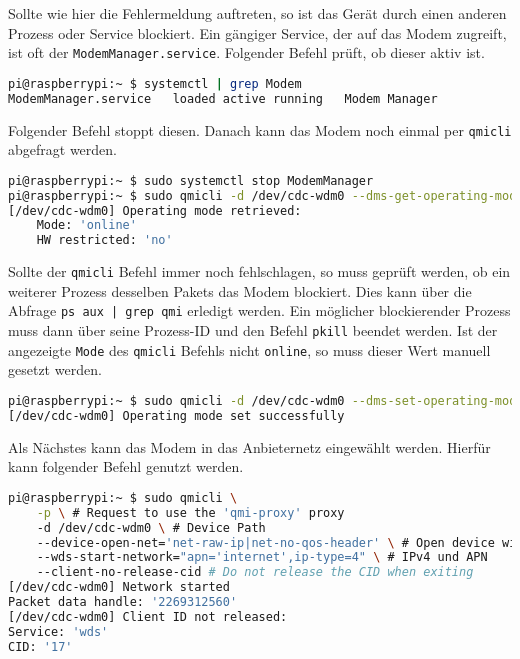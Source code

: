 \noindent Sollte wie hier die Fehlermeldung auftreten, so ist das Gerät durch einen anderen Prozess oder Service blockiert.
Ein gängiger Service, der auf das Modem zugreift, ist oft der \texttt{ModemManager.service}.
Folgender Befehl prüft, ob dieser aktiv ist.

\begin{lstlisting}[language=Bash]
pi@raspberrypi:~ $ systemctl | grep Modem
ModemManager.service   loaded active running   Modem Manager
\end{lstlisting}

\noindent Folgender Befehl stoppt diesen.
Danach kann das Modem noch einmal per \texttt{qmicli} abgefragt werden.

\begin{lstlisting}[language=Bash]
pi@raspberrypi:~ $ sudo systemctl stop ModemManager
pi@raspberrypi:~ $ sudo qmicli -d /dev/cdc-wdm0 --dms-get-operating-mode
[/dev/cdc-wdm0] Operating mode retrieved:
	Mode: 'online'
	HW restricted: 'no'
\end{lstlisting}

\noindent Sollte der \texttt{qmicli} Befehl immer noch fehlschlagen, so muss geprüft werden, ob ein weiterer Prozess desselben
Pakets das Modem blockiert. 
Dies kann über die Abfrage \texttt{ps aux | grep qmi} erledigt werden.
Ein möglicher blockierender Prozess muss dann über seine Prozess-ID und den Befehl \texttt{pkill} beendet werden.
Ist der angezeigte \texttt{Mode} des \texttt{qmicli} Befehls nicht \texttt{online}, so muss dieser Wert manuell gesetzt
werden.

\begin{lstlisting}[language=Bash]
pi@raspberrypi:~ $ sudo qmicli -d /dev/cdc-wdm0 --dms-set-operating-mode='online'
[/dev/cdc-wdm0] Operating mode set successfully
\end{lstlisting}



Als Nächstes kann das Modem in das Anbieternetz eingewählt werden.
Hierfür kann folgender Befehl genutzt werden.

\begin{lstlisting}[language=Bash]
pi@raspberrypi:~ $ sudo qmicli \
    -p \ # Request to use the 'qmi-proxy' proxy
    -d /dev/cdc-wdm0 \ # Device Path
    --device-open-net='net-raw-ip|net-no-qos-header' \ # Open device with specific link protocol and QoS flags
    --wds-start-network="apn='internet',ip-type=4" \ # IPv4 und APN
    --client-no-release-cid # Do not release the CID when exiting
[/dev/cdc-wdm0] Network started
Packet data handle: '2269312560'
[/dev/cdc-wdm0] Client ID not released:
Service: 'wds'
CID: '17'
\end{lstlisting}


